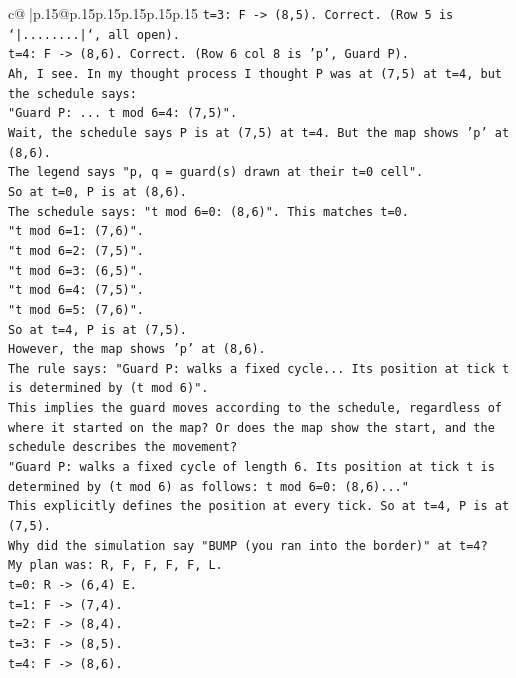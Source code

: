 \documentclass{article}
\begin{document}
{\begin{supertabular}{c@{$\;$}|p{.15\linewidth}@{}p{.15\linewidth}p{.15\linewidth}p{.15\linewidth}p{.15\linewidth}p{.15\linewidth}}
{{{\texttt{t=3: F {-}> (8,5). Correct. (Row 5 is `|........|`, all open).} \\
\texttt{t=4: F {-}> (8,6). Correct. (Row 6 col 8 is 'p', Guard P).} \\
\texttt{Ah, I see. In my thought process I thought P was at (7,5) at t=4, but the schedule says:} \\
\texttt{"Guard P: ... t mod 6=4: (7,5)".} \\
\texttt{Wait, the schedule says P is at (7,5) at t=4. But the map shows 'p' at (8,6).} \\
\texttt{The legend says "p, q = guard(s) drawn at their t=0 cell".} \\
\texttt{So at t=0, P is at (8,6).} \\
\texttt{The schedule says: "t mod 6=0: (8,6)". This matches t=0.} \\
\texttt{"t mod 6=1: (7,6)".} \\
\texttt{"t mod 6=2: (7,5)".} \\
\texttt{"t mod 6=3: (6,5)".} \\
\texttt{"t mod 6=4: (7,5)".} \\
\texttt{"t mod 6=5: (7,6)".} \\
\texttt{So at t=4, P is at (7,5).} \\
\texttt{However, the map shows 'p' at (8,6).} \\
\texttt{The rule says: "Guard P: walks a fixed cycle... Its position at tick t is determined by (t mod 6)".} \\
\texttt{This implies the guard moves according to the schedule, regardless of where it started on the map? Or does the map show the start, and the schedule describes the movement?} \\
\texttt{"Guard P: walks a fixed cycle of length 6. Its position at tick t is determined by (t mod 6) as follows: t mod 6=0: (8,6)..."} \\
\texttt{This explicitly defines the position at every tick. So at t=4, P is at (7,5).} \\
\texttt{Why did the simulation say "BUMP (you ran into the border)" at t=4?} \\
\texttt{My plan was: R, F, F, F, F, L.} \\
\texttt{t=0: R {-}> (6,4) E.} \\
\texttt{t=1: F {-}> (7,4).} \\
\texttt{t=2: F {-}> (8,4).} \\
\texttt{t=3: F {-}> (8,5).} \\
\texttt{t=4: F {-}> (8,6).} \\
}}}
\end{supertabular}}
\end{document}
